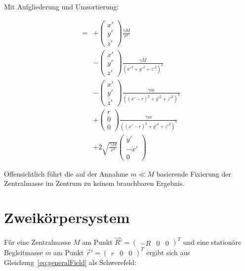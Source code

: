 \documentclass[12pt]{article}
\begin{document}
Mit Aufgliederung und Umsortierung:

\begin{subequations}
\begin{eqnarray}
&=&
+ \left( \begin{matrix} x' \\ y' \\ z' \end{matrix} \right)
 \frac{\gamma M}{r^3} \\
&&
- \left( \begin{matrix} x' \\ y' \\ z' \end{matrix} \right)
 \frac{\gamma M}{\left( x'^{2} + y'^{2} + z'^{2} \right)^3} \\
&&
- \left( \begin{matrix} x' \\ y' \\ z' \end{matrix} \right) \frac{\gamma m}{\left( \left(x' - r\right)^{2} + y'^{2} + z'^{2} \right)^3} \\ 
&&
+ \left( \begin{matrix} r \\ 0 \\ 0 \end{matrix} \right) \frac{\gamma m}{\left( \left(x' - r\right)^{2} + y'^{2} + z'^{2} \right)^3} \\ 
&&
+ 2 \sqrt{\frac{\gamma M}{r^3}} \left( \begin{matrix} \dot{y}' \\ -\dot{x}' \\ 0 \end{matrix} \right)
\end{eqnarray}
\end{subequations}

Offensichtlich führt die auf der Annahme $m \ll M$ basierende Fixierung der Zentralmasse im Zentrum zu keinem brauchbaren Ergebnis.

\section{Zweikörpersystem}

Für eine Zentralmasse $M$ am Punkt $\vec{R}' = \left( \begin{matrix} -R & 0 & 0 \end{matrix} \right)^T$ und eine stationäre Begleitmasse $m$ am Punkt $\vec{r}' = \left( \begin{matrix} r & 0 & 0 \end{matrix} \right)^T$ ergibt sich aus Gleichung~\ref{eq:generalField} als Schwerefeld:
\end{document}
